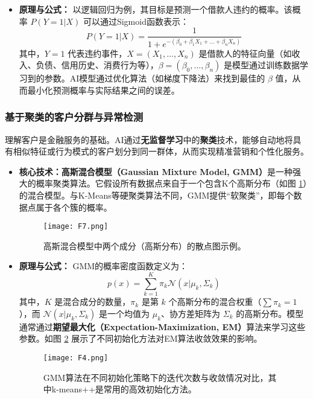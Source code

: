 \begin{itemize}
\begin{itemize}
        \item \textbf{原理与公式：} 以逻辑回归为例，其目标是预测一个借款人违约的概率。该概率 $P(Y=1 | X)$ 可以通过Sigmoid函数表示：
        $$
        P(Y=1 | X) = \frac{1}{1 + e^{-(\beta_0 + \beta_1 X_1 + \dots + \beta_n X_n)}}
        $$
        其中，$Y=1$ 代表违约事件，$X = (X_1, \dots, X_n)$ 是借款人的特征向量（如收入、负债、信用历史、消费行为等），$\beta = (\beta_0, \dots, \beta_n)$ 是模型通过训练数据学习到的参数。AI模型通过优化算法（如梯度下降法）来找到最佳的 $\beta$ 值，从而最小化预测概率与实际结果之间的误差。
    \end{itemize}

    \subsubsection{基于聚类的客户分群与异常检测}
    理解客户是金融服务的基础。AI通过\textbf{无监督学习}中的\textbf{聚类}技术，能够自动地将具有相似特征或行为模式的客户划分到同一群体，从而实现精准营销和个性化服务。
    \begin{itemize}
        \item \textbf{核心技术：高斯混合模型（Gaussian Mixture Model, GMM）}是一种强大的概率聚类算法。它假设所有数据点来自于一个包含K个高斯分布（如图 \ref{fig:gmm_components_example}）的混合模型。与K-Means等硬聚类算法不同，GMM提供“软聚类”，即每个数据点属于各个簇的概率。
        
        \begin{figure}[htbp]
            \centering
            \texttt{[image: F7.png]}
            \caption{高斯混合模型中两个成分（高斯分布）的散点图示例。}
            \label{fig:gmm_components_example}
        \end{figure}

        \item \textbf{原理与公式：} GMM的概率密度函数定义为：
        $$
        p(x) = \sum_{k=1}^{K} \pi_k \mathcal{N}(x | \mu_k, \Sigma_k)
        $$
        其中，$K$ 是混合成分的数量，$\pi_k$ 是第 $k$ 个高斯分布的混合权重（$\sum \pi_k = 1$），而 $\mathcal{N}(x | \mu_k, \Sigma_k)$ 是一个均值为 $\mu_k$、协方差矩阵为 $\Sigma_k$ 的高斯分布。模型通常通过\textbf{期望最大化（Expectation-Maximization, EM）}算法来学习这些参数。如图 \ref{fig:gmm_initialization_comparison} 展示了不同初始化方法对EM算法收敛效果的影响。

        \begin{figure}[htbp]
            \centering
            \texttt{[image: F4.png]}
            \caption{GMM算法在不同初始化策略下的迭代次数与收敛情况对比，其中k-means++是常用的高效初始化方法。}
            \label{fig:gmm_initialization_comparison}
        \end{figure}
        

\end{itemize}
\end{itemize}
